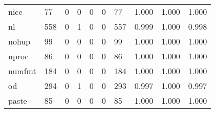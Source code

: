 \begin{longtable}{lp{2.0cm}p{2.0cm}p{2.0cm}p{2.0cm}p{2.0cm}p{2.0cm}p{2.0cm}p{2.0cm}p{2.0cm}}
nice      &                     77 &                                             0 &                                            0 &                                           0 &                                            0 &                                         77 &                                1.000 &                                  1.000 &                                1.000 \\
nl        &                    558 &                                             0 &                                            1 &                                           0 &                                            0 &                                        557 &                                0.999 &                                  1.000 &                                0.998 \\
nohup     &                     99 &                                             0 &                                            0 &                                           0 &                                            0 &                                         99 &                                1.000 &                                  1.000 &                                1.000 \\
nproc     &                     86 &                                             0 &                                            0 &                                           0 &                                            0 &                                         86 &                                1.000 &                                  1.000 &                                1.000 \\
numfmt    &                    184 &                                             0 &                                            0 &                                           0 &                                            0 &                                        184 &                                1.000 &                                  1.000 &                                1.000 \\
od        &                    294 &                                             0 &                                            1 &                                           0 &                                            0 &                                        293 &                                0.997 &                                  1.000 &                                0.997 \\
paste     &                     85 &                                             0 &                                            0 &                                           0 &                                            0 &                                         85 &                                1.000 &                                  1.000 &                                1.000 \\

\end{longtable}

